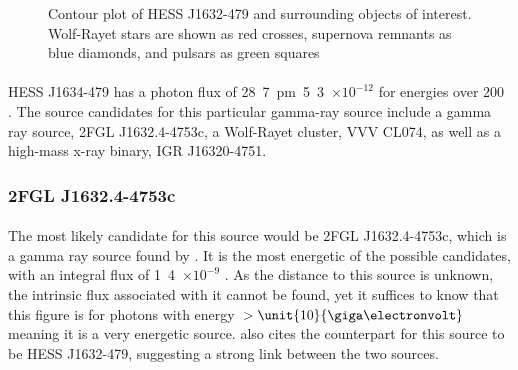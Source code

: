\documentclass[a4paper, titlepage, oneside]{article}
\newcommand{\e}[1]{\ensuremath{\times 10^{#1}}}
\newcommand{\photon}{\mathrm{ph}}
\begin{document}
\begin{multicols}{2}
\begin{figure}[H]
  \centering
  \caption{Contour plot of HESS J1632-479 and surrounding objects of interest. Wolf-Rayet stars are shown as red crosses, supernova remnants as blue diamonds, and pulsars as green squares}
  \label{fig:hess32}
\end{figure}

\paragraph{}
HESS J1634-479 has a photon flux of \unit{28.7\pm5.3\e{-12}}{\photon\usk\centi\metre\rpsquared\usk\reciprocal\second} for energies over \unit{200}{\giga\electronvolt} \parencite{Aharonian:2006}. The source candidates for this particular gamma-ray source include a gamma ray source, 2FGL J1632.4-4753c, a Wolf-Rayet cluster, VVV CL074, as well as a high-mass x-ray binary, IGR J16320-4751.

\subsubsection{2FGL J1632.4-4753c}
\paragraph{}
The most likely candidate for this source would be 2FGL J1632.4-4753c, which is a gamma ray source found by \textcite{Lande:2012}. It is the most energetic of the possible candidates, with an integral flux of \unit{1.4\e{-9}}{\photon\usk\centi\metre\rpsquared\usk\reciprocal\second} \parencite{Lande:2012}. As the distance to this source is unknown, the intrinsic flux associated with it cannot be found, yet it suffices to know that this figure is for photons with energy \(>\unit{10}{\giga\electronvolt}\) meaning it is a very energetic source. \textcite{Lande:2012} also cites the counterpart for this source to be HESS J1632-479, suggesting a strong link between the two sources.


\end{multicols}
\end{document}
